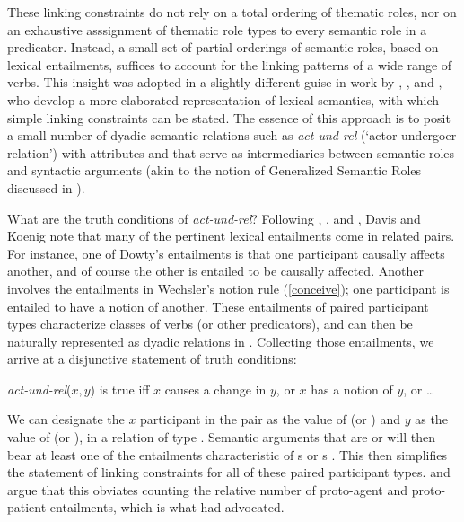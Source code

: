 \documentclass[output=paper
                ,modfonts
                ,nonflat
	        ,collection
	        ,collectionchapter
	        ,collectiontoclongg
 	        ,biblatex
                ,babelshorthands
                ,newtxmath
                ,draftmode
                ,colorlinks, citecolor=brown
]{./langsci/langscibook}
\begin{document}
These linking constraints do not rely on a total ordering of thematic roles, nor on an exhaustive asssignment of thematic role types to every semantic role in a predicator. Instead, a small set of partial orderings of semantic roles, based on lexical entailments, suffices to account for the linking patterns of a wide range of verbs. 
This insight was adopted in a slightly different guise in work by \citet{Davis1996}, \citet{Davis2001}, and \cite{DavisandKoenig2000b}, who develop a more elaborated representation of lexical semantics, with which simple linking constraints can be stated.
The essence of this approach is to posit a small number of dyadic semantic relations such as \textit{act-und-rel} (`actor-undergoer relation') with attributes    and   that serve as intermediaries between semantic roles and syntactic arguments (akin to the notion of Generalized Semantic Roles discussed in \citealt{VanValin1999}).  

What are the truth conditions of \textit{act-und-rel}?  
Following \citet{Fillmore1977}, \citet{Dowty1991}, and \citet{Wechsler1995b}, Davis and Koenig note that many of the pertinent lexical entailments come in related pairs.
For instance, one of Dowty's entailments is that one participant causally affects another, and of course the other is entailed to be causally affected.
Another involves the entailments in Wechsler's notion rule (\ref{conceive}); one participant is entailed to have a notion of another. 
These entailments of paired participant types characterize classes of verbs (or other predicators), and can then be naturally represented as dyadic relations in .  Collecting those entailments, we arrive at a disjunctive statement of truth conditions:

\ea
\label{def-act-und-rel}
\textit{act-und-rel}($x,y$) is true iff $x$ causes a change in $y$, or $x$ has a notion of $y$, or \ldots
\z

\noindent
We can designate the $x$ participant  in the pair as the value of  (or ) and $y$ as the value of  (or ), in a relation of type .   Semantic arguments that are  or  will then bear at least one of the entailments characteristic of s or s \citep[72]{DavisandKoenig2000b}. This then simplifies the statement of linking constraints for all of these paired participant types.
\citet{Davis1996} and \citet{KoenigandDavis2001} argue that this obviates counting the relative number of proto-agent and proto-patient entailments, which is what  \citet{Dowty1991} had advocated.
\end{document}

